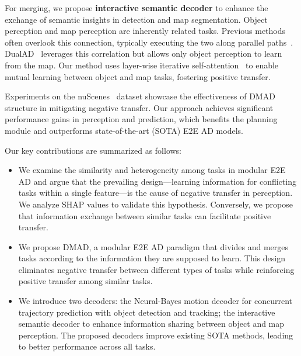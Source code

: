 For merging, we propose \textbf{interactive semantic decoder} to enhance the exchange of semantic insights in detection and map segmentation. Object perception and map perception are inherently related tasks. Previous methods often overlook this connection, typically executing the two along parallel paths~\cite{hu2023planning, jiang2023vad, zheng2025genad}. DualAD~\cite{doll2024dualad} leverages this correlation but allows only object perception to learn from the map. Our method uses layer-wise iterative self-attention~\cite{vaswani2017attention} to enable mutual learning between object and map tasks, fostering positive transfer.

Experiments on the nuScenes~\cite{caesar2020nuscenes} dataset showcase the effectiveness of DMAD structure in mitigating negative transfer. Our approach achieves significant performance gains in perception and prediction, which benefits the planning module and outperforms state-of-the-art (SOTA) \gls{E2E} \gls{AD} models.

Our key contributions are summarized as follows:
\begin{itemize}
    \item We examine the similarity and heterogeneity among tasks in modular \gls{E2E} \gls{AD} and argue that the prevailing design—learning information for conflicting tasks within a single feature—is the cause of negative transfer in perception. We analyze SHAP values to validate this hypothesis. Conversely, we propose that information exchange between similar tasks can facilitate positive transfer.
    \item We propose DMAD, a modular \gls{E2E} \gls{AD} paradigm that divides and merges tasks according to the information they are supposed to learn. This design eliminates negative transfer between different types of tasks while reinforcing positive transfer among similar tasks.
    \item We introduce two decoders: the Neural-Bayes motion decoder for concurrent trajectory prediction with object detection and tracking; the interactive semantic decoder to enhance information sharing between object and map perception. The proposed decoders improve existing SOTA methods, leading to better performance across all tasks.
\end{itemize}










